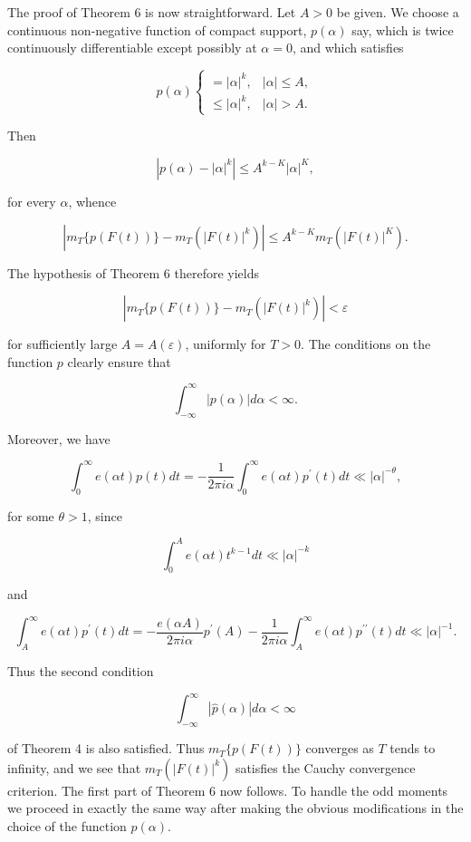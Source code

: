 \documentclass[10pt]{article}
\begin{document}
The proof of Theorem 6 is now straightforward. Let $A>0$ be given. We choose a continuous non-negative function of compact support, $p(\alpha)$ say, which is twice continuously differentiable except possibly at $\alpha=0$, and which satisfies

$$
p(\alpha) \begin{cases}=|\alpha|^{k}, & |\alpha| \leq A, \\ \leq|\alpha|^{k}, & |\alpha|>A .\end{cases}
$$

Then

$$
\left|p(\alpha)-|\alpha|^{k}\right| \leq A^{k-K}|\alpha|^{K},
$$

for every $\alpha$, whence

$$
\left|m_{T}\{p(F(t))\}-m_{T}\left(|F(t)|^{k}\right)\right| \leq A^{k-K} m_{T}\left(|F(t)|^{K}\right) .
$$

The hypothesis of Theorem 6 therefore yields

$$
\left|m_{T}\{p(F(t))\}-m_{T}\left(|F(t)|^{k}\right)\right|<\varepsilon
$$

for sufficiently large $A=A(\varepsilon)$, uniformly for $T>0$. The conditions on the function $p$ clearly ensure that

$$
\int_{-\infty}^{\infty}|p(\alpha)| d \alpha<\infty .
$$

Moreover, we have

$$
\int_{0}^{\infty} e(\alpha t) p(t) d t=-\frac{1}{2 \pi i \alpha} \int_{0}^{\infty} e(\alpha t) p^{\prime}(t) d t \ll|\alpha|^{-\theta},
$$

for some $\theta>1$, since

$$
\int_{0}^{A} e(\alpha t) t^{k-1} d t \ll|\alpha|^{-k}
$$

and

$$
\int_{A}^{\infty} e(\alpha t) p^{\prime}(t) d t=-\frac{e(\alpha A)}{2 \pi i \alpha} p^{\prime}(A)-\frac{1}{2 \pi i \alpha} \int_{A}^{\infty} e(\alpha t) p^{\prime \prime}(t) d t \ll|\alpha|^{-1} .
$$

Thus the second condition

$$
\int_{-\infty}^{\infty}|\widehat{p}(\alpha)| d \alpha<\infty
$$

of Theorem 4 is also satisfied. Thus $m_{T}\{p(F(t))\}$ converges as $T$ tends to infinity, and we see that $m_{T}\left(|F(t)|^{k}\right)$ satisfies the Cauchy convergence criterion. The first part of Theorem 6 now follows. To handle the odd moments we proceed in exactly the same way after making the obvious modifications in the choice of the function $p(\alpha)$.
\end{document}
